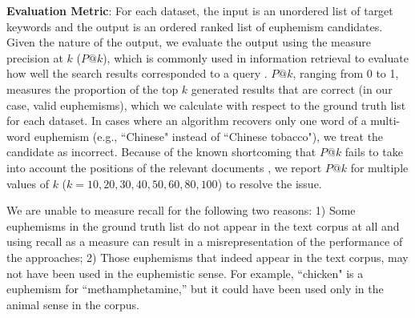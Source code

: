 \noindent \textbf{Evaluation Metric}: 
For each dataset, the input is an unordered list of target keywords and the output is an ordered ranked list of euphemism candidates. 
Given the nature of the output, we evaluate the output using the measure precision at $k$ ($P@k$), which is commonly used in information retrieval to evaluate how well the search results corresponded to a query \cite{manning2008introduction}. 
$P@k$, ranging from 0 to 1, measures the proportion of the top $k$ generated results that are correct (in our case, valid euphemisms), which we calculate with respect to the ground truth list for each dataset. 
In cases where an  algorithm recovers only one word of a multi-word euphemism (e.g., ``Chinese" instead of ``Chinese tobacco"), we treat the candidate as incorrect.
Because of the known shortcoming that $P@k$ fails to take into account the positions of the relevant documents \cite{jarvelin2017ir}, we report $P@k$ for multiple values of $k$ ($k=10, 20, 30, 40, 50, 60, 80, 100$) to resolve the issue. 

We are unable to measure recall for the following two reasons: 
1) Some euphemisms in the ground truth list do not appear in the text corpus at all and using recall as a measure can result in a misrepresentation of the performance of the approaches; 
2) Those euphemisms that indeed appear in the text corpus,  may not have been used in the euphemistic sense. 
For example, ``chicken" is a euphemism for ``methamphetamine,'' but it could have been used only in the animal sense in the corpus. 



